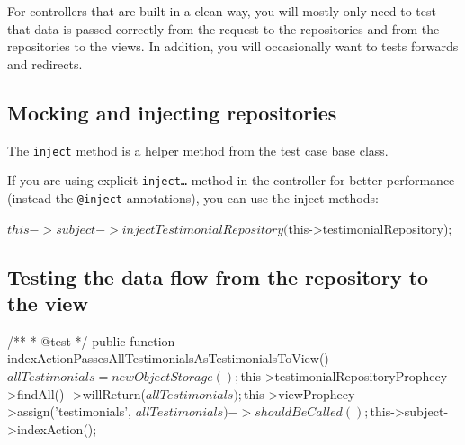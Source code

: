 \documentclass[a4paper,11pt,headsepline]{scrartcl}
\begin{document}
For controllers that are built in a clean way, you will mostly only need to test that data is passed correctly from the request to the repositories and from the repositories to the views. In addition, you will occasionally want to tests forwards and redirects.

\subsection{Mocking and injecting repositories}


The \texttt{inject} method is a helper method from the test case base class.

If you are using explicit \texttt{inject…} method in the controller for better performance (instead the \texttt{@inject} annotations), you can use the inject methods:

\begin{phpcode}
$this->subject->injectTestimonialRepository($this->testimonialRepository);
\end{phpcode}


\subsection{Testing the data flow from the repository to the view}

\begin{phpcode}
/**
  * @test
  */
public function indexActionPassesAllTestimonialsAsTestimonialsToView()
{
    $allTestimonials = new ObjectStorage();
    $this->testimonialRepositoryProphecy->findAll()
        ->willReturn($allTestimonials);

    $this->viewProphecy->assign('testimonials', $allTestimonials)
        ->shouldBeCalled();

    $this->subject->indexAction();
}
\end{phpcode}
\end{document}
